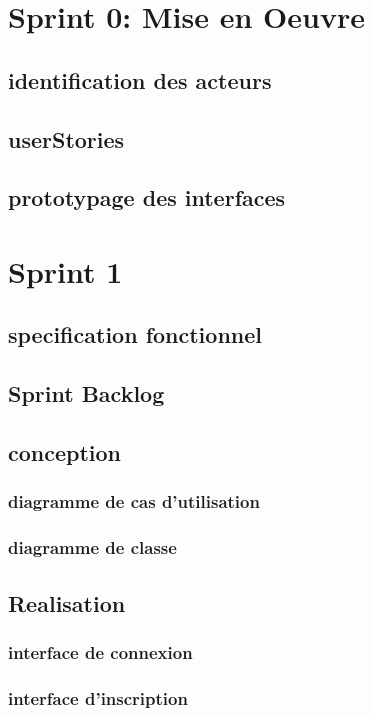 \section{Sprint 0: Mise en Oeuvre}
\subsection{identification des acteurs}
\subsection{userStories}
\subsection{prototypage des interfaces}

\section{Sprint 1}
\subsection{specification fonctionnel}
\subsection{Sprint Backlog}
\subsection{conception}
\subsubsection{diagramme de cas d'utilisation}

\subsubsection{diagramme de classe}

\subsection{Realisation}
\subsubsection{interface de connexion}
\subsubsection{interface d'inscription}
